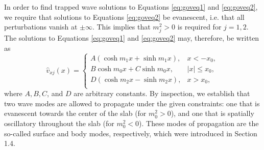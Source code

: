 In order to find trapped wave solutions to Equations \eqref{eq:goveq1} and \eqref{eq:goveq2}, we require that solutions to Equations \eqref{eq:goveq2} be evanescent, i.e. that all perturbations vanish at $\pm \infty$.
This implies that $m_j^2 > 0$ is required for $j = 1, 2$.
The solutions to Equations \eqref{eq:goveq1} and \eqref{eq:goveq2} may, therefore, be written as
\begin{equation}
\label{eq:goveqsol}
 \hat{v}_{xj} (x) =
  \begin{cases}
    A(\cosh m_1 x + \sinh m_1 x),    & x < - x_0,\\[0.3cm]
    B \cosh m_0 x + C \sinh m_0 x,  & |x| \leq x_0,\\[0.3cm]
    D(\cosh m_2 x - \sinh m_2 x),    & x > x_0,\\
  \end{cases}
\end{equation}
where $A, B, C$, and $D$ are arbitrary constants.
By inspection, we establish that two wave modes are allowed to propagate under the given constraints: one that is evanescent towards the center of the slab (for $m_0^2 > 0$), and one that is spatially oscillatory throughout the slab (for $m_0^2 < 0$).
These modes of propagation are the so-called surface and body modes, respectively, which were introduced in Section 1.4.

